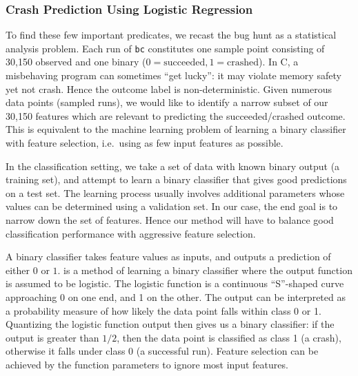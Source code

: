 \subsubsection{Crash Prediction Using Logistic Regression}

To find these few important predicates, we recast the bug hunt as a
statistical analysis problem.  Each run of \texttt{bc} constitutes one
sample point consisting of 30,150 observed  and one
binary  ($0 = \text{succeeded}, 1 = \text{crashed}$).
In C, a misbehaving program can sometimes ``get lucky'': it may
violate memory safety yet not crash.  Hence the outcome label is
non-deterministic.  Given numerous data points (sampled runs), we
would like to identify a narrow subset of our 30,150 features which
are relevant to predicting the succeeded/crashed outcome.  This is
equivalent to the machine learning problem of learning a binary
classifier with feature selection, i.e.\ using as few input features
as possible.

In the classification setting, we take a set of data with known binary
output (a training set), and attempt to learn a binary classifier that
gives good predictions on a test set.  The learning process usually
involves additional parameters whose values can be determined using a
validation set.  In our case, the end goal is to narrow down the set
of features.  Hence our method will have to balance good
classification performance with aggressive feature selection.

A binary classifier takes feature values as inputs, and outputs a
prediction of either $0$ or $1$.  
\cite{Hastie01} is a method of learning a binary classifier where the
output function is assumed to be logistic.  The logistic function is a
continuous ``S''-shaped curve approaching 0 on one end, and 1 on the
other.  The output can be interpreted as a probability measure of how
likely the data point falls within class 0 or 1.  Quantizing the
logistic function output then gives us a binary classifier: if the
output is greater than $1/2$, then the data point is classified as
class 1 (a crash), otherwise it falls under class 0 (a successful
run).  Feature selection can be achieved by  the
function parameters to ignore most input features.

  
